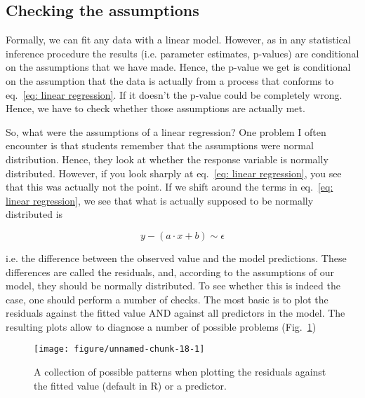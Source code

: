 \documentclass[a4paper,twoside]{tufte-book}\usepackage[]{graphicx}\usepackage[]{color}
\makeatletter
\def\maxwidth{ %
  \ifdim\Gin@nat@width>\linewidth
    \linewidth
  \else
    \Gin@nat@width
  \fi
}
\makeatother
\begin{document}
\subsection{Checking the assumptions}

Formally, we can fit any data with a linear model. However, as in any statistical inference procedure the results (i.e. parameter estimates, p-values) are conditional on the assumptions that we have made. Hence, the p-value we get is conditional on the assumption that the data is actually from a process that conforms to eq.~\ref{eq: linear regression}. If it doesn't the p-value could be completely wrong. Hence, we have to check whether those assumptions are actually met. 

So, what were the assumptions of a linear regression? One problem I often encounter is that students remember that the assumptions were normal distribution. Hence, they look at whether the response variable is normally distributed. However, if you look sharply at eq.~\ref{eq: linear regression}, you see that this was actually not the point. If we shift around the terms in eq.~\ref{eq: linear regression}, we see that what is actually supposed to be normally distributed is 

\begin{equation} \label{eq: linear regression}
y - (a \cdot x + b ) \sim \epsilon 
\end{equation}

i.e. the difference between the observed value and the model predictions. These differences are called the residuals, and, according to the assumptions of our model, they should be normally distributed. To see whether this is indeed the case, one should perform a number of checks. The most basic is to plot the residuals against the fitted value AND against all predictors in the model. The resulting plots allow to diagnose a number of possible problems (Fig.~\ref{fig: ResidualPatterns})

\begin{figure}[htbp]
\begin{center}
\begin{Schunk}

\texttt{[image: figure/unnamed-chunk-18-1]} \end{Schunk}
\caption{A collection of possible patterns when plotting the residuals against the fitted value (default in R) or a predictor.}
\label{fig: ResidualPatterns}
\end{center}
\end{figure}
\end{document}

